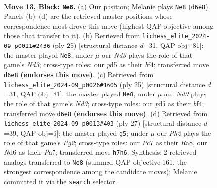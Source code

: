 \documentclass[11pt]{article}
\begin{document}
\clearpage

\begin{figure}[p]\centering
\begin{subfigure}{0.46\textwidth}\centering
\resizebox{\linewidth}{!}{%
\newchessgame
\chessboard[
  setfen={r1bq2k1/pppp1ppp/3n4/3P4/3b4/2N5/PPP2PPP/R1B1QBK1 b - - 2 13},
  showmover=false,
  pgfstyle=straightmove, color=movearrow, markmove={d6-e8}
]}
\caption{}
\end{subfigure}\hfill
\begin{subfigure}{0.46\textwidth}\centering
\resizebox{\linewidth}{!}{%
\newchessgame
\chessboard[
  setfen={r1bq2k1/pppp1ppp/3n4/8/3b1B2/2N5/PPP2PPP/R3QBK1 b - - 1 13},
  showmover=false,
  pgfstyle=straightmove, color=movearrow, markmove={d6-e8}
]}
\caption{}
\end{subfigure}
\\[4pt]
\begin{subfigure}{0.46\textwidth}\centering
\resizebox{\linewidth}{!}{%
\newchessgame
\chessboard[
  setfen={r1bq2k1/pppp1ppp/3n4/8/3b1B2/2N5/PPP2PPP/R3QBK1 b - - 1 13},
  showmover=false,
  pgfstyle=straightmove, color=movearrow, markmove={d6-e8}
]}
\caption{}
\end{subfigure}\hfill
\begin{subfigure}{0.46\textwidth}\centering
\resizebox{\linewidth}{!}{%
\newchessgame
\chessboard[
  setfen={r1bq2k1/ppp2ppp/3p1b2/5n2/3P1B2/2P5/PP1N1PPP/R3QBK1 b - - 1 14},
  showmover=false,
  pgfstyle=straightmove, color=movearrow, markmove={g7-g5}
]}
\caption{}
\end{subfigure}
\caption{\textbf{Move 13, Black: \texttt{Ne8}.} (a) Our position; Melanie plays \texttt{Ne8} (\texttt{d6e8}). Panels (b)--(d) are the retrieved master positions whose correspondence most drove this move (highest QAP objective among those that transfer to it). (b) Retrieved from \texttt{lichess\_elite\_2024-09\_p0021\#2436} (ply 25) [structural distance $d$=31, QAP obj=81]: the master played \texttt{Ne8}; under $\mu$ our \emph{Nd3} plays the role of that game's \emph{Nd3}; cross-type roles: our \emph{p}d5 as their \emph{b}f4; transferred move \texttt{d6e8} \textbf{(endorses this move)}. (c) Retrieved from \texttt{lichess\_elite\_2024-09\_p0026\#1605} (ply 25) [structural distance $d$=31, QAP obj=81]: the master played \texttt{Ne8}; under $\mu$ our \emph{Nd3} plays the role of that game's \emph{Nd3}; cross-type roles: our \emph{p}d5 as their \emph{b}f4; transferred move \texttt{d6e8} \textbf{(endorses this move)}. (d) Retrieved from \texttt{lichess\_elite\_2024-09\_p0013\#403} (ply 27) [structural distance $d$=39, QAP obj=6]: the master played \texttt{g5}; under $\mu$ our \emph{Ph2} plays the role of that game's \emph{Pg2}; cross-type roles: our \emph{P}c7 as their \emph{R}a8, our \emph{N}d6 as their \emph{P}a7; transferred move \texttt{h7h6}. Synthesis: 2 retrieved analogs transferred to \texttt{Ne8} (summed QAP objective 161, the strongest correspondence among the candidate moves); Melanie committed it via the \texttt{search} selector.}
\label{fig:thought-m25}
\end{figure}
\end{document}
